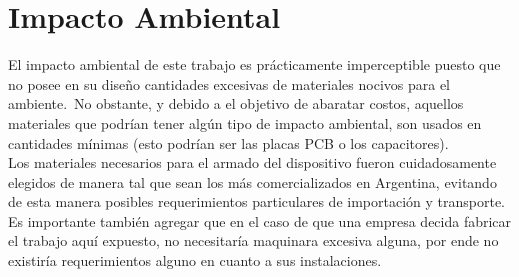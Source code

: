 \chapter{Impacto Ambiental} %

El impacto ambiental de este trabajo es pr\'acticamente imperceptible puesto
que no posee en su dise\~no cantidades excesivas de materiales nocivos para
el ambiente.\
No obstante, y debido a el objetivo de abaratar costos, aquellos materiales
que podr\'ian tener alg\'un tipo de impacto ambiental, son usados en cantidades
m\'inimas (esto podr\'ian ser las placas PCB o los capacitores).\\

Los materiales necesarios para el armado del dispositivo fueron cuidadosamente
elegidos de manera tal que sean los m\'as comercializados en Argentina,
evitando de esta manera posibles requerimientos particulares de importaci\'on y
transporte.\\

Es importante tambi\'en agregar que en el caso de que una empresa decida
fabricar el trabajo aqu\'i expuesto, no necesitar\'ia maquinara excesiva
alguna,
por ende no existir\'ia requerimientos alguno en cuanto a sus instalaciones.